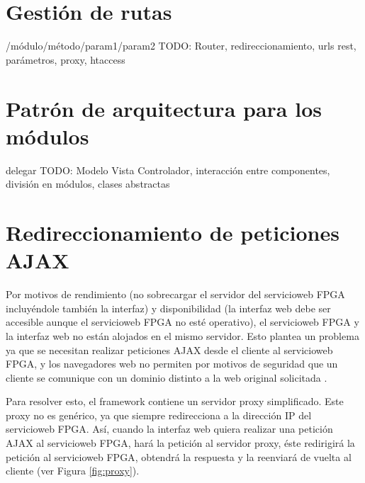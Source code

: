 \section{Gestión de rutas\label{extra:mvc:router}}

/módulo/método/param1/param2
TODO: Router, redireccionamiento, urls rest, parámetros, proxy, htaccess


\section{Patrón de arquitectura para los módulos\label{extra:mvc:mvc}}

delegar
TODO: Modelo Vista Controlador, interacción entre componentes, división en módulos,
clases abstractas



\section{Redireccionamiento de peticiones \gls{AJAX}\label{extra:mvc:proxy}}

Por motivos de rendimiento (no sobrecargar el servidor del \gls{servicioweb} \gls{FPGA} incluyéndole también la interfaz) y disponibilidad (la interfaz web debe ser accesible aunque el \gls{servicioweb} \gls{FPGA} no esté operativo), el \gls{servicioweb} \gls{FPGA} y la interfaz web no están alojados en el mismo servidor. Esto plantea un problema ya que se necesitan realizar peticiones \gls{AJAX} desde el cliente al \gls{servicioweb} \gls{FPGA}, y los navegadores web no permiten por motivos de seguridad que un cliente se comunique con un dominio distinto a la web original solicitada \cite{sameorigin}.

Para resolver esto, el \gls{framework} contiene un servidor \gls{proxy} simplificado. Este \gls{proxy} no es genérico, ya que siempre redirecciona a la dirección IP del \gls{servicioweb} \gls{FPGA}. Así, cuando la interfaz web quiera realizar una petición \gls{AJAX} al \gls{servicioweb} \gls{FPGA}, hará la petición al servidor \gls{proxy}, éste redirigirá la petición al \gls{servicioweb} \gls{FPGA}, obtendrá la respuesta y la reenviará de vuelta al cliente (ver Figura \ref{fig:proxy}).


